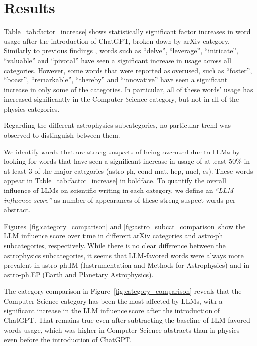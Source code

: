 \documentclass[twocolumn]{aastex701}
\begin{document}
\section{Results}

Table~\ref{tab:factor_increase} shows statistically significant factor increases in word usage after the introduction of ChatGPT, broken down by arXiv category.
Similarly to previous findings \citep{Juzek2024,Bao2025,Kobak2025}, words such as ``delve'', ``leverage'', ``intricate'', ``valuable'' and ``pivotal'' have seen a significant increase in usage across all categories.
However, some words that were reported as overused, such as ``foster'', ``boast'', ``remarkable'', ``thereby'' and ``innovative'' have seen a significant increase in only some of the categories.
In particular, all of these words' usage has increased significantly in the Computer Science category, but not in all of the physics categories.

Regarding the different astrophysics subcategories, no particular trend was observed to distinguish between them.

We identify words that are strong suspects of being overused due to LLMs by looking for words that have seen a significant increase in usage of at least 50\% in at least 3 of the major categories (astro-ph, cond-mat, hep, nucl, cs).
These words appear in Table~\ref{tab:factor_increase} in boldface.
To quantify the overall influence of LLMs on scientific writing in each category, we define an \emph{``LLM influence score''} as number of appearances of these strong suspect words per abstract.

Figures~\ref{fig:category_comparison} and \ref{fig:astro_subcat_comparison} show the LLM influence score over time in different arXiv categories and astro-ph subcategories, respectively.
While there is no clear difference between the astrophysics subcategories, it seems that LLM-favored words were always more prevalent in astro-ph.IM (Instrumentation and Methods for Astrophysics) and in astro-ph.EP (Earth and Planetary Astrophysics).

The category comparison in Figure~\ref{fig:category_comparison} reveals that the Computer Science category has been the most affected by LLMs, with a significant increase in the LLM influence score after the introduction of ChatGPT.
That remains true even after subtracting the baseline of LLM-favored words usage, which was higher in Computer Science abstracts than in physics even before the introduction of ChatGPT.
\end{document}
